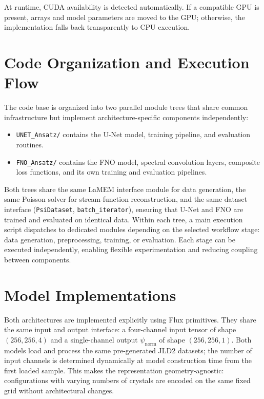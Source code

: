 At runtime, CUDA availability is detected automatically. If a compatible GPU is present, arrays and model parameters are moved to the GPU; otherwise, the implementation falls back transparently to CPU execution.

\section{Code Organization and Execution Flow}

The code base is organized into two parallel module trees that share common infrastructure but implement architecture-specific components independently:

\begin{itemize}
    \item \texttt{UNET\_Ansatz/} contains the U-Net model, training pipeline,
          and evaluation routines.
    \item \texttt{FNO\_Ansatz/} contains the FNO model, spectral convolution
          layers, composite loss functions, and its own training and evaluation
          pipelines.
\end{itemize}

Both trees share the same LaMEM interface module for data generation, the same Poisson solver for stream-function reconstruction, and the same dataset interface (\texttt{PsiDataset}, \texttt{batch\_iterator}), ensuring that U-Net and FNO are trained and evaluated on identical data. Within each tree, a main execution script dispatches to dedicated modules depending on the selected workflow stage: data generation, preprocessing, training, or evaluation. Each stage can be executed independently, enabling flexible experimentation and reducing coupling between components.

\section{Model Implementations}

Both architectures are implemented explicitly using Flux primitives. They share the same input and output interface: a four-channel input tensor of shape $(256,256,4)$ and a single-channel output $\psi_{\mathrm{norm}}$ of shape $(256,256,1)$. Both models load and process the same pre-generated JLD2 datasets; the number of input channels is determined dynamically at model construction time from the first loaded sample. This makes the representation geometry-agnostic: configurations with varying numbers of crystals are encoded on the same fixed grid without architectural changes.

